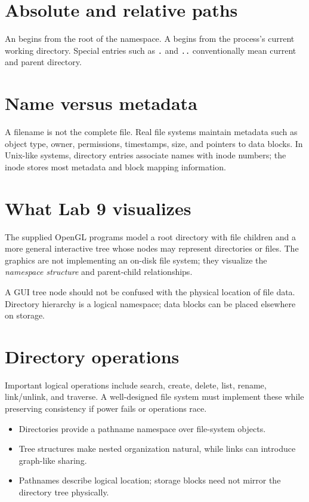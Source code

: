 \section{Absolute and relative paths}
An  begins from the root of the namespace. A  begins from the process's current working directory. Special entries such as \texttt{.} and \texttt{..} conventionally mean current and parent directory.

\section{Name versus metadata}
A filename is not the complete file. Real file systems maintain metadata such as object type, owner, permissions, timestamps, size, and pointers to data blocks. In Unix-like systems, directory entries associate names with inode numbers; the inode stores most metadata and block mapping information.

\section{What Lab 9 visualizes}
The supplied OpenGL programs model a root directory with file children and a more general interactive tree whose nodes may represent directories or files. The graphics are not implementing an on-disk file system; they visualize the \emph{namespace structure} and parent-child relationships.

\begin{pitfall}
A GUI tree node should not be confused with the physical location of file data. Directory hierarchy is a logical namespace; data blocks can be placed elsewhere on storage.
\end{pitfall}

\section{Directory operations}
Important logical operations include search, create, delete, list, rename, link/unlink, and traverse. A well-designed file system must implement these while preserving consistency if power fails or operations race.





\begin{chapterrecap}
\begin{itemize}
  \item Directories provide a pathname namespace over file-system objects.
  \item Tree structures make nested organization natural, while links can introduce graph-like sharing.
  \item Pathnames describe logical location; storage blocks need not mirror the directory tree physically.
\end{itemize}
\end{chapterrecap}
